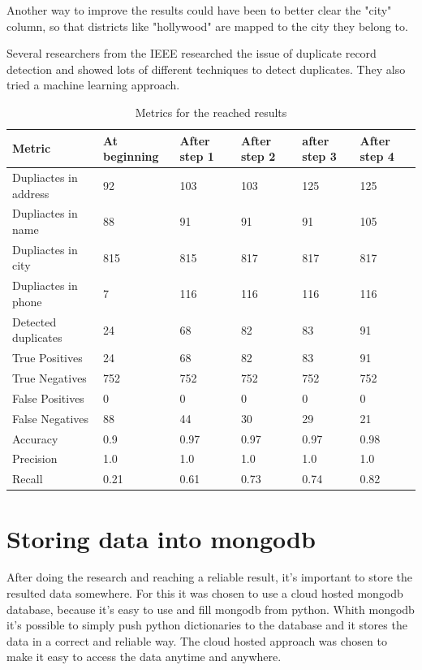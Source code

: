 \documentclass[conference]{IEEEtran}
\begin{document}
Another way to improve the results could have been to better clear the "city" column, so that districts like "hollywood" are mapped to the city they belong to. 

Several researchers from the IEEE researched the issue of duplicate record detection and showed lots of different techniques to detect duplicates. They also tried a machine learning approach\cite{bib:foreign_research}.   
\begin{table}[t]
	\begin{center}
		\caption{Metrics for the reached results}
		\label{tab:results} 
		\begin{tabular}{|p{1.5cm}||p{0.8cm}|p{0.8cm}|p{0.8cm}|p{0.8cm}|p{0.8cm}|}
			\hline
			Metric & At beginning & After step 1 & After step 2 & after step 3 & After step 4 \\ 
			\hline\hline
			Dupliactes in address &92&103&103&125&125\\
			\hline
			Dupliactes in name &88&91&91&91&105\\
			\hline
			Dupliactes in city &815&815&817&817&817\\
			\hline
			Dupliactes in phone &7 & 116&116&116&116\\
			\hline
			Detected duplicates &24&68&82&83&91\\
			\hline
			True Positives &24&68&82&83&91  \\ 
			\hline
			True Negatives &752&752&752&752&752  \\  
			\hline
			False Positives &0&0&0&0&0\\  
			\hline
			False Negatives &88 &44&30&29&21\\  
			\hline
			Accuracy &0.9&0.97&0.97&0.97&0.98\\  
			\hline
			Precision &1.0 & 1.0&1.0&1.0&1.0\\  
			\hline
			Recall &0.21&0.61&0.73&0.74&0.82\\
			\hline
		\end{tabular}
	\end{center}
\end{table}
\section{Storing data into mongodb}
After doing the research and reaching a reliable result, it's important to store the resulted data somewhere. For this it was chosen to use a cloud hosted mongodb database, because it's easy to use and fill mongodb from python. Whith mongodb it's possible to simply push python dictionaries to the database and it stores the data in a correct and reliable way. The cloud hosted approach was chosen to make it easy to access the data anytime and anywhere. 
\end{document}
